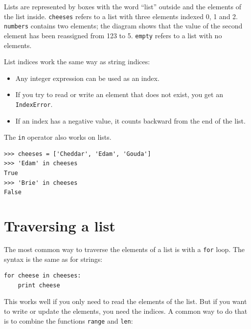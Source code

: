 \documentclass[10pt]{book}
\begin{document}
Lists are represented by boxes with the word ``list'' outside
and the elements of the list inside.  {\tt cheeses} refers to
a list with three elements indexed 0, 1 and 2.
{\tt numbers} contains two elements; the diagram shows that the
value of the second element has been reassigned from 123 to 5.
{\tt empty} refers to a list with no elements.


List indices work the same way as string indices:

\begin{itemize}

\item Any integer expression can be used as an index.

\item If you try to read or write an element that does not exist, you
get an {\tt IndexError}.


\item If an index has a negative value, it counts backward from the
end of the list.

\end{itemize}




The {\tt in} operator also works on lists.

\beforeverb
\begin{verbatim}
>>> cheeses = ['Cheddar', 'Edam', 'Gouda']
>>> 'Edam' in cheeses
True
>>> 'Brie' in cheeses
False
\end{verbatim}
\afterverb


\section{Traversing a list}

The most common way to traverse the elements of a list is
with a {\tt for} loop.  The syntax is the same as for strings:

\beforeverb
\begin{verbatim}
for cheese in cheeses:
    print cheese
\end{verbatim}
\afterverb
%
This works well if you only need to read the elements of the
list.  But if you want to write or update the elements, you
need the indices.  A common way to do that is to combine
the functions {\tt range} and {\tt len}:
\end{document}

